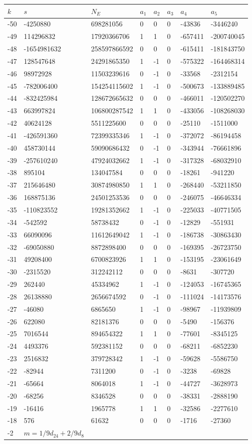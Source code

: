 \documentclass{amsart}
\begin{document}
\begin{longtable}{|l|l|l|lllll|}
\hline
$k$ & $s$ & $N_E$ & $a_1$ & $a_2$ & $a_3$ & $a_4$ & $a_5$\\
\hline
-50&-4250880&698281056&0&0&0&-43836&-3446240\\
-49&114296832&17920366706&1&1&0&-657411&-200740045\\
-48&-1654981632&258597866592&0&0&0&-615411&-181843750\\
-47&128547648&24291865350&1&-1&0&-575322&-164468314\\
-46&98972928&11503239616&0&-1&0&-33568&-2312154\\
-45&-782006400&154254115602&1&-1&0&-500673&-133889485\\
-44&-832425984&128672665632&0&0&0&-466011&-120502270\\
-43&663997824&106800287542&1&1&0&-433056&-108268030\\
-42&40624128&5511225600&0&0&0&-25110&-1511000\\
-41&-426591360&72399335346&1&-1&0&-372072&-86194458\\
-40&458730144&59090686432&0&-1&0&-343944&-76661896\\
-39&-257610240&47924032662&1&-1&0&-317328&-68032910\\
-38&895104&134047584&0&0&0&-18261&-941220\\
-37&215646480&30874980850&1&1&0&-268440&-53211850\\
-36&168875136&24501253536&0&0&0&-246075&-46646334\\
-35&-110823552&19281352662&1&-1&0&-225033&-40771505\\
-34&-542592&58738432&0&-1&0&-12829&-551931\\
-33&66090096&11612649042&1&-1&0&-186738&-30863430\\
-32&-69050880&8872898400&0&0&0&-169395&-26723750\\
-31&49208400&6700823926&1&1&0&-153195&-23061649\\
-30&-2315520&312242112&0&0&0&-8631&-307720\\
-29&262440&45334962&1&-1&0&-124053&-16745365\\
-28&26138880&2656674592&0&-1&0&-111024&-14173576\\
-27&-46080&6865650&1&-1&0&-98967&-11939809\\
-26&622080&82181376&0&0&0&-5490&-156376\\
-25&7016544&894654322&1&1&0&-77601&-8345125\\
-24&4493376&592381152&0&0&0&-68211&-6852230\\
-23&2516832&379728342&1&-1&0&-59628&-5586750\\
-22&-82944&7311200&0&-1&0&-3238&-69828\\
-21&-65664&8064018&1&-1&0&-44727&-3628973\\
-20&-68256&8346528&0&0&0&-38331&-2888190\\
-19&-16416&1965778&1&1&0&-32586&-2277610\\
-18&576&61632&0&0&0&-1716&-27360\\
-2&$m=1/9d_{24}+2/9d_{8}$&&\multicolumn{5}{c|}{}\\
\hline
\end{longtable}
\end{document}
